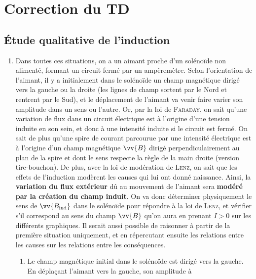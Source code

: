\documentclass[a4paper, 10pt, final, garamond]{book}
\begin{document}
\setcounter{chapter}{2}

\chapter{Correction du TD}
\section{Étude qualitative de l'induction}
\label{sec:indqualicorr}

\begin{enumerate}
	\item Dans toutes ces situations, on a un aimant proche d'un solénoïde non
	      alimenté, formant un circuit fermé par un ampèremètre. Selon
	      l'orientation de l'aimant, il y a initialement dans le solénoïde un
	      champ magnétique dirigé vers la gauche ou la droite (les lignes de champ
	      sortent par le Nord et rentrent par le Sud), et le déplacement de
	      l'aimant va venir faire varier son amplitude dans un sens ou l'autre.
	      \bigbreak
	      Or, par la loi de \textsc{Faraday}, on sait qu'une variation de flux
	      dans un circuit électrique est à l'origine d'une tension induite en son
	      sein, et donc à une intensité induite si le circuit est fermé. On sait
	      de plus qu'une spire de courant parcourue par une intensité électrique
	      est à l'origine d'un champ magnétique $\vv{B}$ dirigé
	      perpendiculairement au plan de la spire et dont le sens respecte la
	      règle de la main droite (version tire-bouchon).
	      \bigbreak
	      De plus, avec la loi de modération de \textsc{Lenz}, on sait que les
	      effets de l'induction modèrent les causes qui lui ont donné naissance.
	      Ainsi, la \textbf{variation du flux extérieur} dû au mouvement de
	      l'aimant sera \textbf{modéré par la création du champ induit}.
	      \bigbreak
	      On va donc déterminer physiquement le sens de $\vv{B_{\rm ind}}$ dans le
	      solénoïde pour répondre à la loi de \textsc{Lenz}, et vérifier s'il
	      correspond au sens du champ $\vv{B}$ qu'on aura en prenant $I > 0$ sur
	      les différents graphiques. Il serait aussi possible de raisonner à
	      partir de la première situation uniquement, et en répercutant ensuite
	      les relations entre les causes sur les relations entre les conséquences.
	      \begin{enumerate}
		      \item Le champ magnétique initial dans le solénoïde est dirigé vers
		            la gauche. En déplaçant l'aimant vers la gauche, son amplitude à

\end{enumerate}
\end{enumerate}
\end{document}
